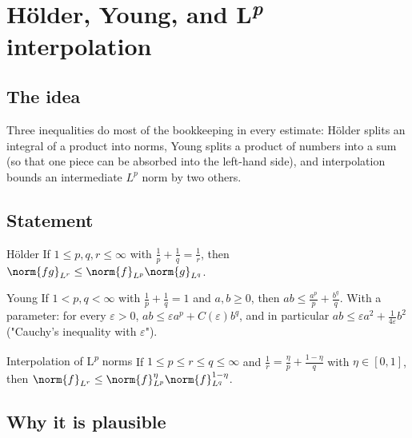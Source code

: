 
\section{Hölder, Young, and L\textsuperscript{\textit{p}} interpolation}\label{p:elementary-inequalities}

\subsection*{The idea}

Three inequalities do most of the bookkeeping in every estimate: Hölder splits an integral of a product into norms, Young splits a product of numbers into a sum (so that one piece can be absorbed into the left-hand side), and interpolation bounds an intermediate $L^p$ norm by two others.

\subsection*{Statement}

\begin{thmbox}{Hölder}
If $1 \le p, q, r \le \infty$ with $\frac1p + \frac1q = \frac1r$, then $\norm{fg}_{L^r} \le \norm{f}_{L^p}\norm{g}_{L^q}$.
\end{thmbox}

\begin{thmbox}{Young}
If $1 < p, q < \infty$ with $\frac1p + \frac1q = 1$ and $a, b \ge 0$, then $ab \le \frac{a^p}{p} + \frac{b^q}{q}$. With a parameter: for every $\varepsilon > 0$, $ab \le \varepsilon a^p + C(\varepsilon) b^q$, and in particular $ab \le \varepsilon a^2 + \frac{1}{4\varepsilon} b^2$ ("Cauchy's inequality with $\varepsilon$").
\end{thmbox}

\begin{thmbox}{Interpolation of L\textsuperscript{\textit{p}} norms}
If $1 \le p \le r \le q \le \infty$ and $\frac1r = \frac{\eta}{p} + \frac{1-\eta}{q}$ with $\eta\in[0,1]$, then $\norm{f}_{L^r} \le \norm{f}_{L^p}^{\eta}\norm{f}_{L^q}^{1-\eta}$.
\end{thmbox}

\subsection*{Why it is plausible}

